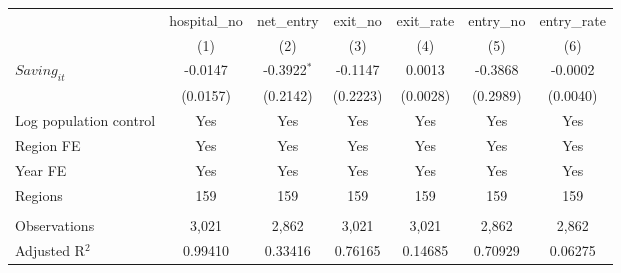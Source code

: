 \begingroup
\centering
\begin{tabular}{lcccccc}
   \toprule
                          & hospital\_no  & net\_entry    & exit\_no  & exit\_rate  & entry\_no  & entry\_rate \\    
                          & (1)           & (2)           & (3)       & (4)         & (5)        & (6)\\  
   \midrule 
   $Saving_{it}$          & -0.0147       & -0.3922$^{*}$ & -0.1147   & 0.0013      & -0.3868    & -0.0002\\   
                          & (0.0157)      & (0.2142)      & (0.2223)  & (0.0028)    & (0.2989)   & (0.0040)\\   
   Log population control & Yes           & Yes           & Yes       & Yes         & Yes        & Yes\\  
   Region FE              & Yes           & Yes           & Yes       & Yes         & Yes        & Yes\\  
   Year FE                & Yes           & Yes           & Yes       & Yes         & Yes        & Yes\\  
   Regions                & 159           & 159           & 159       & 159         & 159        & 159\\  
    \\
   Observations           & 3,021         & 2,862         & 3,021     & 3,021       & 2,862      & 2,862\\  
   Adjusted R$^2$         & 0.99410       & 0.33416       & 0.76165   & 0.14685     & 0.70929    & 0.06275\\  
   \bottomrule
\end{tabular}
\par\endgroup
